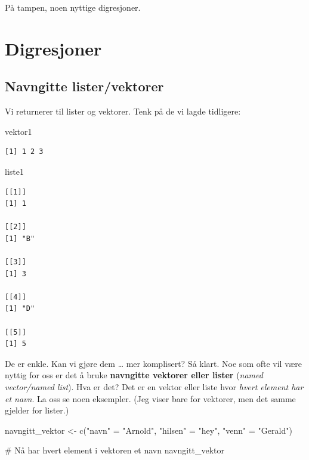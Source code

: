 \documentclass[
  letterpaper,
  DIV=11,
  numbers=noendperiod]{scrreprt}
\newenvironment{Shaded}{\begin{snugshade}}{\end{snugshade}}
\newcommand{\CommentTok}[1]{\textcolor[rgb]{0.37,0.37,0.37}{#1}}
\newcommand{\FunctionTok}[1]{\textcolor[rgb]{0.28,0.35,0.67}{#1}}
\newcommand{\NormalTok}[1]{\textcolor[rgb]{0.00,0.23,0.31}{#1}}
\newcommand{\OtherTok}[1]{\textcolor[rgb]{0.00,0.23,0.31}{#1}}
\newcommand{\StringTok}[1]{\textcolor[rgb]{0.13,0.47,0.30}{#1}}
\begin{document}
På tampen, noen nyttige digresjoner.

\hypertarget{digresjoner}{%
\section{Digresjoner}\label{digresjoner}}

\hypertarget{sec-navngitt-vektor}{%
\subsection{Navngitte lister/vektorer}\label{sec-navngitt-vektor}}

Vi returnerer til lister og vektorer. Tenk på de vi lagde tidligere:

\begin{Shaded}
\begin{Highlighting}[]
\NormalTok{vektor1}
\end{Highlighting}
\end{Shaded}

\begin{verbatim}
[1] 1 2 3
\end{verbatim}

\begin{Shaded}
\begin{Highlighting}[]
\NormalTok{liste1}
\end{Highlighting}
\end{Shaded}

\begin{verbatim}
[[1]]
[1] 1

[[2]]
[1] "B"

[[3]]
[1] 3

[[4]]
[1] "D"

[[5]]
[1] 5
\end{verbatim}

De er enkle. Kan vi gjøre dem \ldots{} mer komplisert? Så klart. Noe som
ofte vil være nyttig for oss er det å bruke \textbf{navngitte vektorer
eller lister} (\emph{named vector/named list}). Hva er det? Det er en
vektor eller liste hvor \emph{hvert element har et navn}. La oss se noen
eksempler. (Jeg viser bare for vektorer, men det samme gjelder for
lister.)

\begin{Shaded}
\begin{Highlighting}[]
\NormalTok{navngitt\_vektor }\OtherTok{\textless{}{-}} \FunctionTok{c}\NormalTok{(}\StringTok{"navn"} \OtherTok{=} \StringTok{"Arnold"}\NormalTok{,}
                     \StringTok{"hilsen"} \OtherTok{=} \StringTok{"hey"}\NormalTok{,}
                     \StringTok{"venn"} \OtherTok{=} \StringTok{"Gerald"}\NormalTok{)}

\CommentTok{\# Nå har hvert element i vektoren et navn}
\NormalTok{navngitt\_vektor}
\end{Highlighting}
\end{Shaded}
\end{document}
